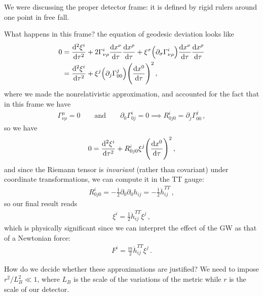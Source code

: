 \documentclass[main.tex]{subfiles}
\begin{document}

We were discussing the proper detector frame: it is defined by rigid rulers around one point in free fall. 

What happens in this frame? the equation of geodesic deviation looks like 
%
\begin{subequations}
\begin{align}
0 &= \dv[2]{\xi^{i}}{\tau}
+ 2 \Gamma^{i}_{\nu \rho } \dv{x^{\nu }}{\tau } \dv{x^{\rho }}{\tau }
+ \xi^{\sigma } \qty( \partial_{\sigma } \Gamma^{i}_{\nu \rho } ) \dv{x^{\nu }}{\tau } \dv{x^{\rho }}{\tau }  \\
&=\dv[2]{\xi^{i}}{\tau}
+ \xi^{j} \qty(\partial_{j} \Gamma^{j}_{00}) \qty(\dv{x^{0}}{\tau })^2
\,,
\end{align}
\end{subequations}
%
where we made the nonrelativistic approximation, and accounted for the fact that in this frame we have  
%
\begin{align}
\Gamma^{\mu }_{\nu \rho } = 0
\qquad \text{and} \qquad
\partial_0 \Gamma^{i}_{0j} =0 
\implies 
R^{i}_{0j0} = \partial_{j} \Gamma^{j}_{00} 
\,,
\end{align}
%
so we have 
%
\begin{align}
0= \dv[2]{\xi^{i}}{\tau } + R^{i}_{0j0} \xi^{j} \qty(\dv{x^{0}}{\tau })^2
\,,
\end{align}
%
and since the Riemann tensor is \emph{invariant} (rather than covariant) under coordinate transformations, we can compute it in the TT gauge: 
%
\begin{align}
 R^{i}_{0j0} = - \frac{1}{2} \partial_0 \partial_0 h_{ij} = - \frac{1}{2} \ddot{h}_{ij}^{TT}
\,,
\end{align}
%
so our final result reads 
%
\begin{align}
\xi^{i} = \frac{1}{2} \ddot{h}^{TT}_{ij} \xi^{j}
\,,
\end{align}
%
which is physically significant since we can interpret the effect of the GW as that of a Newtonian force: 
%
\begin{align}
F^{i} = \frac{m}{2} \ddot{h}^{TT}_{ij} \xi^{j}
\,.
\end{align}

How do we decide whether these approximations are justified?
We need to impose \(r^2 / L_B^2 \ll 1 \), where \(L_B\) is the scale of the variations of the metric while \(r\) is the scale of our detector. 
\end{document}
